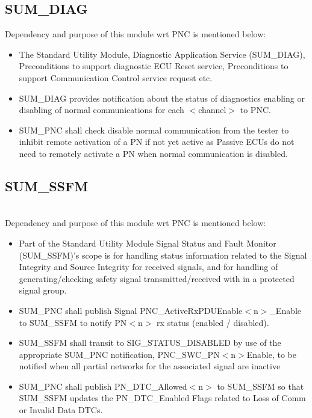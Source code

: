 {     }


\subsection{SUM\_DIAG}

Dependency and purpose of this module wrt PNC is mentioned below:

\begin{itemize}
	\item The Standard Utility Module, Diagnostic Application Service (SUM\_DIAG), Preconditions to support diagnostic ECU Reset service, Preconditions to support Communication Control service request etc.
    \item SUM\_DIAG provides notification about the status of diagnostics enabling or disabling of normal communications for each $<$channel$>$ to PNC.
    \item SUM\_PNC shall check disable normal communication from the tester to inhibit remote activation of a PN if not yet active as Passive ECUs do not need to remotely activate a PN when normal communication is disabled.
\end{itemize}

{}

\subsection{SUM\_SSFM}
\\
Dependency and purpose of this module wrt PNC is mentioned below:

\begin{itemize}
\item Part of the Standard Utility Module Signal Status and Fault Monitor (SUM\_SSFM)’s scope is for handling status information related to the Signal Integrity and Source Integrity for received signals, and for handling of generating/checking safety signal transmitted/received with in a protected signal group.

\item SUM\_PNC shall publish Signal PNC\_ActiveRxPDUEnable$<$n$>$\_Enable to SUM\_SSFM to notify PN$<$n$>$ rx status (enabled / disabled).

\item SUM\_SSFM shall transit to SIG\_STATUS\_DISABLED by use of the appropriate SUM\_PNC notification, PNC\_SWC\_PN$<$n$>$Enable, to be notified when all partial networks for the associated signal are inactive

\item SUM\_PNC shall publish PN\_DTC\_Allowed$<$n$>$ to SUM\_SSFM so that SUM\_SSFM updates the PN\_DTC\_Enabled Flags related to Loss of Comm or Invalid Data DTCs.

\end{itemize}

